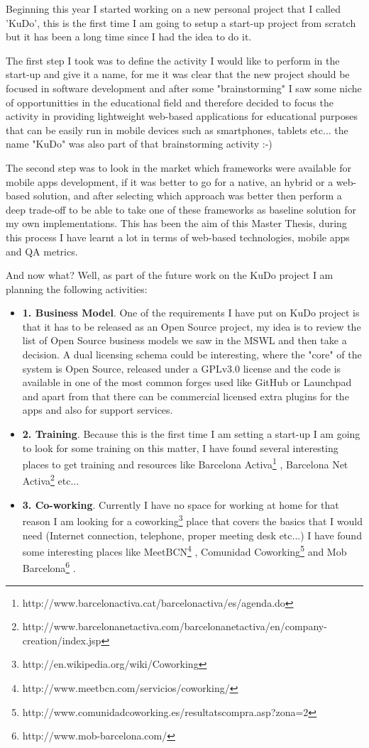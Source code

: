 \documentclass[a4paper,12pt]{book}
\begin{document}
Beginning this year I started working on a new personal project that I called 'KuDo', this is the first time I am going to setup a start-up project from scratch but it has been a long time since I had the idea to do it. 

The first step I took was to define the activity I would like to perform in the start-up  and give it a name, for me it was clear that the new project should be focused in software development and after some "brainstorming" I saw some niche of opportunitties in the educational field and therefore decided to focus the activity in providing lightweight web-based applications for educational purposes that can be easily run in mobile devices such as smartphones, tablets etc... the name "KuDo" was also part of that brainstorming activity :-)

The second step was to look in the market which frameworks were available for mobile apps development, if it was better to go for a native, an hybrid or a web-based solution, and after selecting which approach was better then perform a deep trade-off to be able to take one of these frameworks as baseline solution for my own implementations. This has been the aim of this Master Thesis, during this process I have learnt a lot in terms of web-based technologies, mobile apps and QA metrics.

And now what? Well, as part of the future work on the KuDo project I am planning the following activities:

\begin{itemize}
 \item \textbf{1. Business Model}. One of the requirements I have put on KuDo project is that it has to be  released as an Open Source project, my idea is to review the list of Open Source business models we saw in the MSWL and then take a decision. A dual licensing schema could be interesting, where the "core" of the system is Open Source, released under a GPLv3.0 license and the code is available in one of the most common forges used like GitHub or Launchpad and apart from that there can be commercial licensed extra plugins for the apps and also for support services.
 \item \textbf{2. Training}. Because this is the first time I am setting a start-up I am going to look for some training on this matter, I have found several interesting places to get training and resources like Barcelona Activa\footnote{http://www.barcelonactiva.cat/barcelonactiva/es/agenda.do} , Barcelona Net Activa\footnote{http://www.barcelonanetactiva.com/barcelonanetactiva/en/company-creation/index.jsp} etc...
 \item \textbf{3. Co-working}. Currently I have no space for working at home for that reason I am looking for a coworking\footnote{http://en.wikipedia.org/wiki/Coworking} place that covers the basics that I would need (Internet connection, telephone, proper meeting desk etc...) I have found some interesting places like MeetBCN\footnote{http://www.meetbcn.com/servicios/coworking/} , Comunidad Coworking\footnote{http://www.comunidadcoworking.es/resultatscompra.asp?zona=2}  and Mob Barcelona\footnote{http://www.mob-barcelona.com/} .
\end{itemize}
\end{document}

